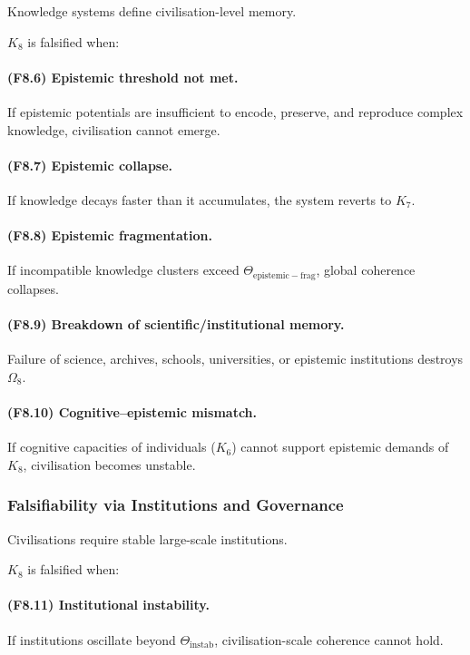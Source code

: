 Knowledge systems define civilisation-level memory.

$K_8$ is falsified when:

\paragraph{(F8.6) Epistemic threshold not met.}
If epistemic potentials are insufficient
to encode, preserve, and reproduce complex knowledge,
civilisation cannot emerge.

\paragraph{(F8.7) Epistemic collapse.}
If knowledge decays faster than it accumulates,
the system reverts to $K_7$.

\paragraph{(F8.8) Epistemic fragmentation.}
If incompatible knowledge clusters exceed
$\Theta_{\mathrm{epistemic-frag}}$,
global coherence collapses.

\paragraph{(F8.9) Breakdown of scientific/institutional memory.}
Failure of science, archives, schools, universities,
or epistemic institutions destroys $\Omega_8$.

\paragraph{(F8.10) Cognitive–epistemic mismatch.}
If cognitive capacities of individuals ($K_6$)
cannot support epistemic demands of $K_8$,
civilisation becomes unstable.



\subsubsection{Falsifiability via Institutions and Governance}

Civilisations require stable large-scale institutions.

$K_8$ is falsified when:

\paragraph{(F8.11) Institutional instability.}
If institutions oscillate beyond $\Theta_{\mathrm{instab}}$,
civilisation-scale coherence cannot hold.

